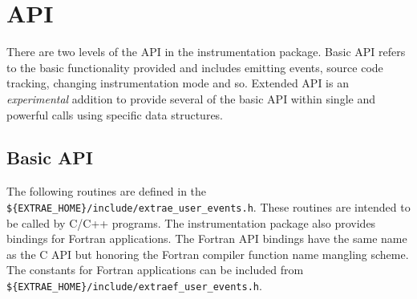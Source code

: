 \chapter{\TRACE API}\label{cha:API}

There are two levels of the API in the \TRACE instrumentation package. Basic API refers to the basic functionality provided and includes emitting events, source code tracking, changing instrumentation mode and so. Extended API is an {\em experimental} addition to provide several of the basic API within single and powerful calls using specific data structures.

\section{Basic API}\label{sec:BasicAPI}

The following routines are defined in the {\tt \$\{EXTRAE\_HOME\}/include/extrae\_user\_events.h}. These routines are intended to be called by C/C++ programs. The instrumentation package also provides bindings for Fortran applications. The Fortran API bindings have the same name as the C API but honoring the Fortran compiler function name mangling scheme. The \TRACE constants for Fortran applications can be included from {\tt \$\{EXTRAE\_HOME\}/include/extraef\_user\_events.h}.

